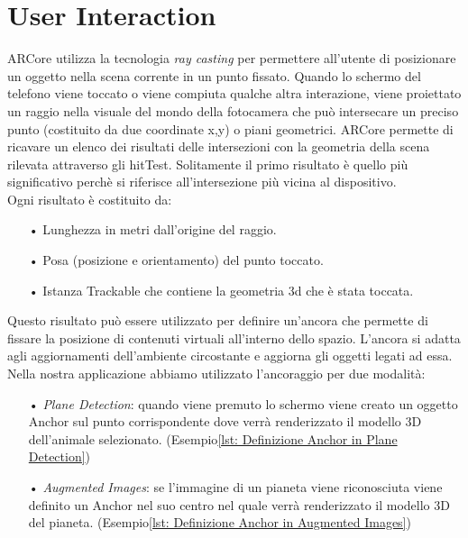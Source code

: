 \documentclass[crop=false, class=book]{standalone}
\begin{document}
	\chapter{User Interaction}
	ARCore utilizza la tecnologia \textit{ray casting} per permettere all'utente di posizionare un oggetto nella scena corrente 	in un punto fissato. Quando lo schermo del telefono viene toccato o viene compiuta qualche altra interazione, 					viene proiettato un raggio nella visuale del mondo della fotocamera che può intersecare un preciso punto (costituito da 		due coordinate x,y) o piani geometrici. ARCore permette di ricavare un elenco dei risultati delle intersezioni con la 			geometria della scena rilevata attraverso gli hitTest. Solitamente il primo risultato è quello più significativo 				perchè si riferisce all'intersezione più vicina al dispositivo.\\
	Ogni risultato è costituito da:
	
	\begin{itemize}
		\item[•] Lunghezza in metri dall'origine del raggio.
		\item[•] Posa (posizione e orientamento) del punto toccato.
		\item[•] Istanza Trackable che contiene la geometria 3d che è stata toccata.
	\end{itemize}
	
	\begin{flushleft}
	Questo risultato può essere utilizzato per definire un'ancora che permette di fissare la posizione di 							contenuti virtuali all'interno dello spazio. L'ancora si adatta agli aggiornamenti dell'ambiente circostante e aggiorna gli 	oggetti legati ad essa.\\
	Nella nostra applicazione abbiamo utilizzato l'ancoraggio per due modalità: 
		\begin{itemize}
		\item[•] \emph{Plane Detection}: quando viene premuto lo schermo viene creato un oggetto Anchor sul punto corrispondente dove verrà renderizzato il modello 3D dell'animale selezionato. (Esempio\vref{lst: Definizione Anchor in Plane Detection})
		\item[•] \emph{Augmented Images}: se l'immagine di un pianeta viene riconosciuta viene definito un Anchor nel suo centro nel quale verrà renderizzato il modello 3D del pianeta. (Esempio\vref{lst: Definizione Anchor in Augmented Images})
	\end{itemize}
	\end{flushleft}
	
\end{document}

